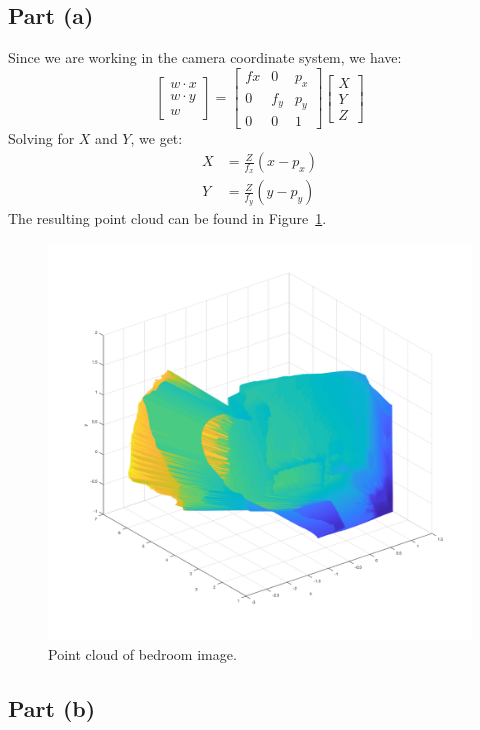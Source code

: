 \documentclass[12pt]{article}
\begin{document}
\subsection*{Part (a)}

Since we are working in the camera coordinate system, we have:
%
\begin{equation}
    \begin{bmatrix}
        w \cdot x \\ w \cdot y \\ w
    \end{bmatrix} =
    \begin{bmatrix}
        fx & 0   & p_x \\
        0  & f_y & p_y \\
        0  & 0   & 1
    \end{bmatrix} \begin{bmatrix} X \\ Y \\ Z \end{bmatrix}
\end{equation}
%
Solving for $X$ and $Y$, we get:
%
\begin{align}
    X &= \frac{Z}{f_x} (x - p_x) \\
    Y &= \frac{Z}{f_y} (y - p_y)
\end{align}
%
The resulting point cloud can be found in Figure~\ref{fig:ec_a}.
%
\begin{figure}
    \includegraphics[width=\linewidth]{output/ec_output.png}
    \caption{Point cloud of bedroom image.}
    \label{fig:ec_a}
\end{figure}
%
\subsection*{Part (b)}
%




\end{document}
